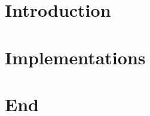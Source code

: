 \section[Intro]{Introduction}



\section[Impl]{Implementations}



% 
% 
% 
% 
% 
% 
% 


\section[End]{End}


